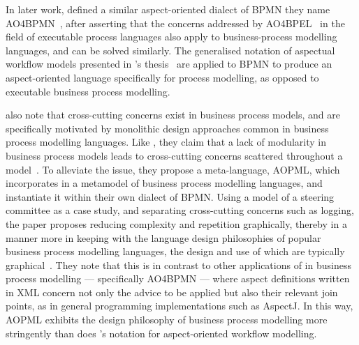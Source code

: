 In later work, \citeauthor{charfi2010AO4BPMN} defined a similar aspect-oriented
dialect of BPMN they name AO4BPMN~\cite{charfi2010AO4BPMN}, after asserting that
the concerns addressed by
AO4BPEL~\cite{Charfi2006AspectOrientedWL,charfi2007ao4bpel} in the field of
executable process languages also apply to business-process modelling languages,
and can be solved similarly. The generalised notation of aspectual
workflow models presented in \citeauthor{Charfi2006AspectOrientedWL}'s
thesis~\cite{Charfi2006AspectOrientedWL} are applied to BPMN to produce an
aspect-oriented language specifically for process modelling, as opposed to
executable business process modelling. 

 also note that cross-cutting concerns exist in
business process models, and are specifically motivated by monolithic design
approaches common in business process modelling languages. Like
\citeauthor{kiczales1997aspect}, they claim that a lack of modularity in
business process models leads to cross-cutting concerns scattered throughout a
model~\cite{Cappelli_AOBPM}. To alleviate the issue, they propose a
meta-language, AOPML, which incorporates \aspectorientation{} in a metamodel of
business process modelling languages, and instantiate it within their own
dialect of BPMN. Using a model of a steering committee as a case study, and
separating cross-cutting concerns such as logging, the paper proposes reducing
complexity and repetition graphically, thereby in a manner more in keeping with
the language design philosophies of popular business process modelling
languages, the design and use of which are typically
graphical~\cite{OMG-BPMN-SPEC,opm_original,OMG-UML-SPEC}. They note that this is
in contrast to other applications of \aspectorientation{} in business process
modelling --- specifically AO4BPMN --- where aspect definitions written in
XML concern not only the advice to be applied but also their relevant join
points, as in general programming \aspectorientation{} implementations such as
AspectJ. In this way, AOPML exhibits the design philosophy of business process
modelling more stringently than does \citeauthor{Charfi2006AspectOrientedWL}'s
notation for aspect-oriented workflow modelling.


